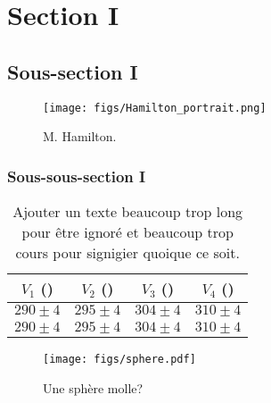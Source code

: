 \documentclass[../main.tex]{subfiles}
\begin{document}
    \section{Section I}
    \blindtext[4]\cite{texbook}

    \subsection{Sous-section I}
    \begin{wrapfigure}{r}{0.4\textwidth}
        \centering
        \texttt{[image: figs/Hamilton\_portrait.png]}
        \caption{M. Hamilton.\cite{texbook}}
        \label{fig: hamilton_portrait}
    \end{wrapfigure}
    \blindtext[4]\cite{latex:companion}

    \subsubsection{Sous-sous-section I}
    \blindtext\cite{latex2e}

    \begin{table}[h!]
        \centering
        \begin{tabular}{cccc} \toprule
            $V_1$ (\V{}) & $V_2$ (\V{}) & $V_3$ (\V{}) & $V_4$ (\V{}) \\\midrule\midrule
            $290 \pm 4$ & $295 \pm 4$ & $304 \pm 4$ & $310 \pm 4$ \\
            $290 \pm 4$ & $295 \pm 4$ & $304 \pm 4$ & $310 \pm 4$ \\
            \bottomrule
        \end{tabular}
        \caption{Ajouter un texte beaucoup trop long pour être ignoré
        et beaucoup trop cours pour signigier quoique ce soit.}
        \label{table: tableau_1.1.1}
    \end{table}

    \blindtext[3]

    \begin{figure}[h!]
        \begin{center}
            \texttt{[image: figs/sphere.pdf]}
        \end{center}
        \caption{Une sphère molle?}
        \label{fig: oui_une_sphere}
    \end{figure}
\end{document}
